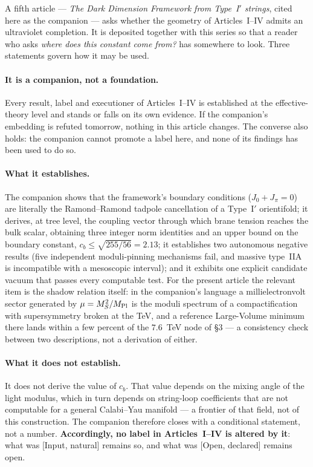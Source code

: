 A fifth article --- \emph{The Dark Dimension Framework from Type~I$'$ strings}, cited here as the companion --- asks whether the geometry of Articles~I--IV admits an ultraviolet completion. It is deposited together with this series so that a reader who asks \emph{where does this constant come from?} has somewhere to look. Three statements govern how it may be used.

\paragraph{It is a companion, not a foundation.} Every result, label and executioner of Articles~I--IV is established at the effective-theory level and stands or falls on its own evidence. If the companion's embedding is refuted tomorrow, nothing in this article changes. The converse also holds: the companion cannot promote a label here, and none of its findings has been used to do so.

\paragraph{What it establishes.} The companion shows that the framework's boundary conditions ($J_{0}+J_{\pi}=0$) are literally the Ramond--Ramond tadpole cancellation of a Type~I$'$ orientifold; it derives, at tree level, the coupling vector through which brane tension reaches the bulk scalar, obtaining three integer norm identities and an upper bound on the boundary constant, $c_{b}\leq\sqrt{255/56}=2.13$; it establishes two autonomous negative results (five independent moduli-pinning mechanisms fail, and massive type~IIA is incompatible with a mesoscopic interval); and it exhibits one explicit candidate vacuum that passes every computable test. For the present article the relevant item is the shadow relation itself: in the companion's language a millielectronvolt sector generated by $\mu=M_S^{2}/M_{\rm Pl}$ is the moduli spectrum of a compactification with supersymmetry broken at the TeV, and a reference Large-Volume minimum there lands within a few percent of the $7.6$~TeV node of \S3 --- a consistency check between two descriptions, not a derivation of either.

\paragraph{What it does not establish.} It does not derive the value of $c_{b}$. That value depends on the mixing angle of the light modulus, which in turn depends on string-loop coefficients that are not computable for a general Calabi--Yau manifold --- a frontier of that field, not of this construction. The companion therefore closes with a conditional statement, not a number. \textbf{Accordingly, no label in Articles~I--IV is altered by it}: what was [Input, natural] remains so, and what was [Open, declared] remains open.

